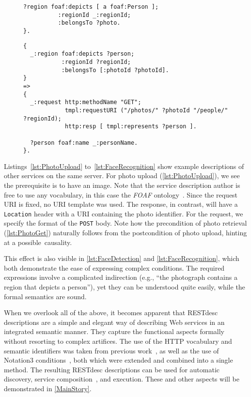 \documentclass[smallextended]{svjour3}
\begin{document}
{\begin{figure}
\begin{lstlisting}[caption=RESTdesc description of face detection,
                   label=lst:FaceDetection, escapechar=§]
  ?region foaf:depicts [ a foaf:Person ];
          :regionId _:regionId;
          :belongsTo ?photo.
}.
\end{lstlisting}
\end{figure}

\begin{figure}
\begin{lstlisting}[caption=RESTdesc description of face recognition,
                   label=lst:FaceRecognition, escapechar=§, belowcaptionskip=-1em]
{
  _:region foaf:depicts ?person;
           :regionId ?regionId;
           :belongsTo [:photoId ?photoId].
}
=>
{
  _:request http:methodName "GET";
            tmpl:requestURI ("/photos/" ?photoId "/people/" ?regionId);
            http:resp [ tmpl:represents ?person ].
  
  ?person foaf:name _:personName.
}.
\end{lstlisting}
\end{figure}

Listings~\ref{lst:PhotoUpload} to~\ref{lst:FaceRecognition} show example descriptions of other services on the same server. For photo upload (\autoref{lst:PhotoUpload}), we see the prerequisite is to have an image. Note that the service description author is free to use any vocabulary, in this case the \emph{FOAF} ontology~\cite{FOAF}. Since the request URI is fixed, no URI template was used. The response, in contrast, will have a \Verb!Location! header with a URI containing the photo identifier. For the request, we specify the format of the \Verb!POST! body. Note how the precondition of photo retrieval (\autoref{lst:PhotoGet}) naturally follows from the postcondition of photo upload, hinting at a possible~causality.

This effect is also visible in \autoref{lst:FaceDetection} and \autoref{lst:FaceRecognition}, which both demonstrate the ease of expressing complex conditions. The required expressions involve a complicated indirection (e.g., ``the photograph contains a region that depicts a person''), yet they can be understood quite easily, while the formal semantics are sound.

When we overlook all of the above, it becomes apparent that RESTdesc descriptions are a simple and elegant way of describing Web services in an integrated semantic manner. They capture the functional aspects formally without resorting to complex artifices. The use of the HTTP vocabulary and semantic identifiers was taken from previous work~\cite{Steiner:2011p5006}, as well as the use of \mbox{Notation3} conditions~\cite{Verborgh:2010p2746}, both which were extended and combined into a single method. The resulting \mbox{RESTdesc} descriptions can be used for automatic discovery, service composition~\cite{Sathappan,Verborgh:2011p4792}, and execution. These and other aspects will be demonstrated in \autoref{MainStory}.

}
\end{document}
